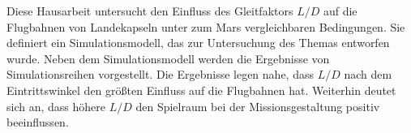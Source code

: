 Diese Hausarbeit untersucht den Einfluss des Gleitfaktors $L/D$ auf die Flugbahnen von Landekapseln unter zum Mars vergleichbaren Bedingungen. Sie definiert ein Simulationsmodell, das zur Untersuchung des Themas entworfen wurde. Neben dem Simulationsmodell werden die Ergebnisse von Simulationsreihen vorgestellt. Die Ergebnisse legen nahe, dass $L/D$ nach dem Eintrittswinkel den größten Einfluss auf die Flugbahnen hat. Weiterhin deutet sich an, dass höhere $L/D$ den Spielraum bei der Missionsgestaltung positiv beeinflussen.
